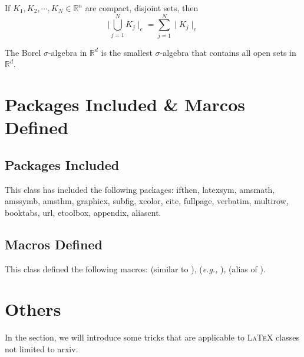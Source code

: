 \documentclass[11pt]{arxiv}
\begin{document}
\begin{corollary}\label{coro: compact}
If $K_1, K_2,\cdots,K_N\in\mathbb{R}^n$ are compact, disjoint sets, then 
$$
\mid \bigcup_{j=1}^{N}K_j \mid_{e} = \sum_{j=1}^N\mid K_j\mid_e
$$
\end{corollary}

\begin{definition}\label{def: borel}
The Borel $\sigma$-algebra in $\mathbb{R}^d$ is the smallest $\sigma$-algebra that contains all open sets in $\mathbb{R}^d$.
\end{definition}

\section{Packages Included \& Marcos Defined}\label{sec: packages-and-macros}

\subsection{Packages Included}\label{subsec: packages}

This class has included the following packages: {\code ifthen, latexsym, amsmath, amssymb, amsthm, graphicx, subfig, xcolor, 
cite, fullpage, verbatim, multirow, booktabs, url, etoolbox, appendix, aliascnt}. 

\subsection{Macros Defined}\label{subsec: macros}

This class defined the following macros: \texttt{\code} (similar to \texttt{\it}), 
\texttt{\email} ({\it e.g.,} \texttt{}), \texttt{\authormark} (alias of \texttt{\footnotemark}). 



\appendix

\section{Others}\label{appsec: others}

In the section, we will introduce some tricks that are applicable to \textsc{LaTeX} classes not limited to {\code arxiv}. 
\end{document}
